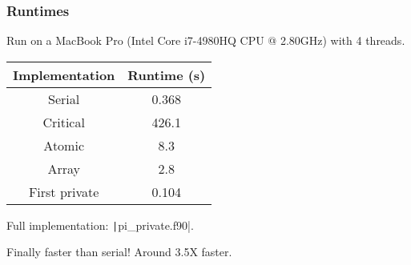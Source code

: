 \documentclass{beamer}
\begin{document}
\begin{frame}
\frametitle{Runtimes}
Run on a MacBook Pro (Intel Core i7-4980HQ CPU @ 2.80GHz) with 4 threads.

\vfill

\begin{table}
\begin{tabular}{cc}
\toprule
Implementation & Runtime (s) \\
\midrule
Serial        & 0.368 \\
Critical      & 426.1 \\
Atomic        & 8.3 \\
Array         & 2.8 \\
First private & 0.104 \\
\bottomrule
\end{tabular}
\end{table}

Full implementation: \texttt|pi_private.f90|.

\begin{center}
\large Finally faster than serial! Around 3.5X faster.
\end{center}

\end{frame}

\end{document}
